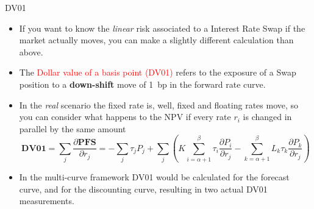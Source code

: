 \documentclass{beamer}
\begin{document}
\begin{frame}{DV01}
\begin{itemize}
	\item<1-> If you want to know the \emph{linear} risk associated to a Interest Rate Swap if the market actually moves, you can make a slightly different calculation than above.
	\item<2-> The \textcolor{red}{Dollar value of a basis point (DV01)} refers to the exposure of a Swap position to a \textbf{down-shift} move of 1~bp in the forward rate curve.
	\item<3-> In the \emph{real} scenario the fixed rate is, well, fixed and floating rates move, so you can consider what happens to the NPV if every rate $r_i$ is changed in parallel by the same amount
	\begin{equation*}
	\textbf{DV01} = \sum_j \frac{\partial \textbf{PFS}}{\partial r_j} = -\sum_{j}\tau_jP_j+\sum_{j}\left(K\sum_{i=\alpha+1}^\beta\tau_i\frac{\partial P_i}{\partial r_j} - \sum_{k=\alpha+1}^\beta L_k\tau_k\frac{\partial P_k}{\partial r_j}\right)
	\end{equation*}
	\item<4-> In the multi-curve framework DV01 would be calculated for the forecast curve, and for the discounting curve, resulting in two actual DV01 measurements.
\end{itemize}
\end{frame}

\end{document}
